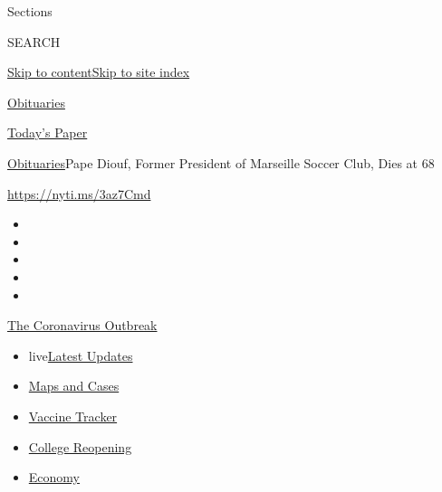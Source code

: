 Sections

SEARCH

\protect\hyperlink{site-content}{Skip to
content}\protect\hyperlink{site-index}{Skip to site index}

\href{https://www.nytimes3xbfgragh.onion/section/obituaries}{Obituaries}

\href{https://myaccount.nytimes3xbfgragh.onion/auth/login?response_type=cookie\&client_id=vi}{}

\href{https://www.nytimes3xbfgragh.onion/section/todayspaper}{Today's
Paper}

\href{/section/obituaries}{Obituaries}\textbar{}Pape Diouf, Former
President of Marseille Soccer Club, Dies at 68

\url{https://nyti.ms/3az7Cmd}

\begin{itemize}
\item
\item
\item
\item
\item
\end{itemize}

\href{https://www.nytimes3xbfgragh.onion/news-event/coronavirus?action=click\&pgtype=Article\&state=default\&region=TOP_BANNER\&context=storylines_menu}{The
Coronavirus Outbreak}

\begin{itemize}
\tightlist
\item
  live\href{https://www.nytimes3xbfgragh.onion/2020/08/04/world/coronavirus-covid-19.html?action=click\&pgtype=Article\&state=default\&region=TOP_BANNER\&context=storylines_menu}{Latest
  Updates}
\item
  \href{https://www.nytimes3xbfgragh.onion/interactive/2020/us/coronavirus-us-cases.html?action=click\&pgtype=Article\&state=default\&region=TOP_BANNER\&context=storylines_menu}{Maps
  and Cases}
\item
  \href{https://www.nytimes3xbfgragh.onion/interactive/2020/science/coronavirus-vaccine-tracker.html?action=click\&pgtype=Article\&state=default\&region=TOP_BANNER\&context=storylines_menu}{Vaccine
  Tracker}
\item
  \href{https://www.nytimes3xbfgragh.onion/2020/08/02/us/covid-college-reopening.html?action=click\&pgtype=Article\&state=default\&region=TOP_BANNER\&context=storylines_menu}{College
  Reopening}
\item
  \href{https://www.nytimes3xbfgragh.onion/live/2020/08/03/business/stock-market-today-coronavirus?action=click\&pgtype=Article\&state=default\&region=TOP_BANNER\&context=storylines_menu}{Economy}
\end{itemize}


